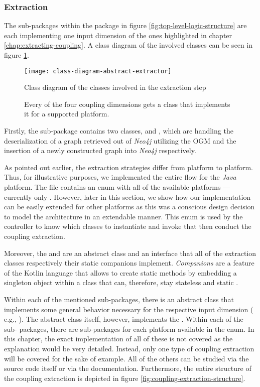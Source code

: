 \documentclass[12pt,a4paper]{report}
\begin{document}
\subsubsection{Extraction}
The sub-packages within the package 
in figure \ref{fig:top-level-logic-structure} are each
implementing one input dimension of the ones highlighted in chapter
\ref{chap:extracting-coupling}.
A class diagram of the involved classes can be seen in
figure \ref{fig:class-diagram-abstract-extractor}.

\begin{figure}[htbp]
\centering
\texttt{[image: class-diagram-abstract-extractor]}
\caption{Class diagram of the classes involved in the extraction step}
\caption*{\centering
  Every of the four coupling dimensions gets a class that implements it
  for a supported platform.
}
\label{fig:class-diagram-abstract-extractor}
\end{figure}

Firstly, the sub-package  contains two classes,  and , which are handling the
deserialization of a graph retrieved out of \textit{Neo4j} utilizing the OGM
and the insertion of a newly constructed graph into \textit{Neo4j}
respectively.

As pointed out earlier, the extraction strategies differ from platform to
platform. Thus, for illustrative purposes, we implemented the entire flow for
the \textit{Java} platform. The  file contains an enum with
all of the available platforms --- currently only . However, later
in this section, we show how our implementation can be easily extended for
other platforms as this was a conscious design decision to model the
architecture in an extendable manner. This enum is used by the controller to
know which classes to instantiate and invoke that then conduct the coupling
extraction.

Moreover, the  and  are an
abstract class and an interface that all of the extraction classes respectively
their static companions implement. \textit{Companions} are a feature of the
Kotlin language that allows to create static methods by embedding a singleton
object within a class that can, therefore, stay stateless and static
\cite{kotlin-companions}.

Within each of the mentioned sub-packages, there is an abstract class that
implements some general behavior necessary for the respective input dimension (
e.g., ). The abstract class itself,
however, implements the . Within each of the sub-
packages, there are sub-packages for each platform available in the  enum. In this chapter, the exact implementation of all of these is
not covered as the explanation would be very detailed. Instead, only one type
of coupling extraction will be covered for the sake of example. All of the
others can be studied via the source code itself or via the documentation.
Furthermore, the entire structure of the coupling extraction is depicted in
figure \ref{fig:coupling-extraction-structure}.
\end{document}

